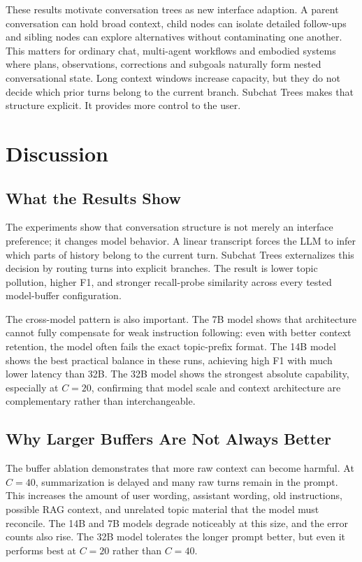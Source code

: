 \documentclass[pdflatex,sn-mathphys-num]{sn-jnl}%
\theoremstyle{thmstyleone}%
\theoremstyle{thmstyletwo}%
\theoremstyle{thmstylethree}%
\begin{document}
These results motivate conversation trees as new interface adaption. A parent conversation can hold broad context, child nodes can isolate detailed follow-ups and sibling nodes can explore alternatives without contaminating one another. This matters for ordinary chat, multi-agent workflows and embodied systems where plans, observations, corrections and subgoals naturally form nested conversational state. Long context windows increase capacity, but they do not decide which prior turns belong to the current branch. Subchat Trees makes that structure explicit.
It provides more control to the user.

\section{Discussion}\label{sec5}

\subsection{What the Results Show}\label{subsec:discussion_results}

The experiments show that conversation structure is not merely an interface preference; it changes model behavior. A linear transcript forces the LLM to infer which parts of history belong to the current turn. Subchat Trees externalizes this decision by routing turns into explicit branches. The result is lower topic pollution, higher F1, and stronger recall-probe similarity across every tested model-buffer configuration.

The cross-model pattern is also important. The 7B model shows that architecture cannot fully compensate for weak instruction following: even with better context retention, the model often fails the exact topic-prefix format. The 14B model shows the best practical balance in these runs, achieving high F1 with much lower latency than 32B. The 32B model shows the strongest absolute capability, especially at $C=20$, confirming that model scale and context architecture are complementary rather than interchangeable.

\subsection{Why Larger Buffers Are Not Always Better}\label{subsec:larger_buffers}

The buffer ablation demonstrates that more raw context can become harmful. At $C=40$, summarization is delayed and many raw turns remain in the prompt. This increases the amount of user wording, assistant wording, old instructions, possible RAG context, and unrelated topic material that the model must reconcile. The 14B and 7B models degrade noticeably at this size, and the error counts also rise. The 32B model tolerates the longer prompt better, but even it performs best at $C=20$ rather than $C=40$.
\end{document}
